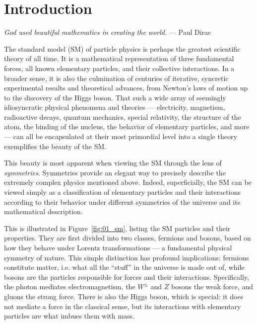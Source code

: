 
\chapter{Introduction}
\label{sec:01_intro}

\begin{center}
	\centering
	\noindent
	\textit{God used beautiful mathematics in creating the world.} --- Paul Dirac~\cite{pagels2012cosmic}
\end{center}

\baselineskip

The standard model (SM) of particle physics is perhaps the greatest scientific theory of all time.
It is a mathematical representation of three fundamental forces, all known elementary particles, and their collective interactions.
In a broader sense, it is also the culmination of centuries of iterative, syncretic experimental results and theoretical advances, from Newton's laws of motion up to the discovery of the Higgs boson.
That such a wide array of seemingly idiosyncratic physical phenomena and theories --- electricity, magnetism, radioactive decays, quantum mechanics, special relativity, the structure of the atom, the binding of the nucleus, the behavior of elementary particles, and more --- can all be encapsulated at their most primordial level into a single theory exemplifies the beauty of the SM.

This beauty is most apparent when viewing the SM through the lens of \textit{symmetries}.
Symmetries provide an elegant way to precisely describe the extremely complex physics mentioned above.
Indeed, superficially, the SM can be viewed simply as a classification of elementary particles and their interactions according to their behavior under different symmetries of the universe and its mathematical description.

This is illustrated in Figure~\ref{fig:01_sm}, listing the SM particles and their properties.
They are first divided into two classes, fermions and bosons, based on how they behave under Lorentz transformations --- a fundamental physical symmetry of nature.
This simple distinction has profound implications: fermions constitute matter, i.e. what all the ``stuff'' in the universe is made out of, while bosons are the particles responsible for forces and their interactions.
Specifically, the photon mediates electromagnetism, the $W^{\pm}$ and $Z$ bosons the weak force, and gluons the strong force.
There is also the Higgs boson, which is special: it does not mediate a force in the classical sense, but its interactions with elementary particles are what imbues them with mass.

